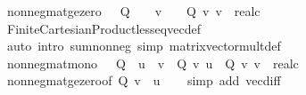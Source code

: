 \begin{isabellebody}
\endisatagproof
{\isafoldproof}%
%
\isadelimproof
\isanewline
%
\endisadelimproof
\isanewline
{}\isamarkupfalse%
\ nonneg{\isacharunderscore}{\kern0pt}mat{\isacharunderscore}{\kern0pt}ge{\isacharunderscore}{\kern0pt}zero{\isacharcolon}{\kern0pt}\ {\isachardoublequoteopen}{}\ {\isasymle}\ Q\ {\isasymLongrightarrow}\ {}\ {\isasymle}\ v\ {\isasymLongrightarrow}\ {}\ {\isasymle}\ Q\ {\isacharasterisk}{\kern0pt}v\ {\isacharparenleft}{\kern0pt}v\ {\isacharcolon}{\kern0pt}{\isacharcolon}{\kern0pt}\ real{\isacharcircum}{\kern0pt}{\isacharprime}{\kern0pt}c{\isacharparenright}{\kern0pt}{\isachardoublequoteclose}\isanewline
%
\isadelimproof
\ \ %
\endisadelimproof
%
\isatagproof
{}\isamarkupfalse%
\ Finite{\isacharunderscore}{\kern0pt}Cartesian{\isacharunderscore}{\kern0pt}Product{\isachardot}{\kern0pt}less{\isacharunderscore}{\kern0pt}eq{\isacharunderscore}{\kern0pt}vec{\isacharunderscore}{\kern0pt}def\isanewline
\ \ \isamarkupfalse%
\ {\isacharparenleft}{\kern0pt}auto\ intro{\isacharbang}{\kern0pt}{\isacharcolon}{\kern0pt}\ sum{\isacharunderscore}{\kern0pt}nonneg\ simp{\isacharcolon}{\kern0pt}\ matrix{\isacharunderscore}{\kern0pt}vector{\isacharunderscore}{\kern0pt}mult{\isacharunderscore}{\kern0pt}def{\isacharparenright}{\kern0pt}%
\endisatagproof
{\isafoldproof}%
%
\isadelimproof
\isanewline
%
\endisadelimproof
\isanewline
{}\isamarkupfalse%
\ nonneg{\isacharunderscore}{\kern0pt}mat{\isacharunderscore}{\kern0pt}mono{\isacharcolon}{\kern0pt}\ {\isachardoublequoteopen}{}\ {\isasymle}\ Q\ {\isasymLongrightarrow}\ u\ {\isasymle}\ v\ {\isasymLongrightarrow}\ Q\ {\isacharasterisk}{\kern0pt}v\ u\ {\isasymle}\ Q\ {\isacharasterisk}{\kern0pt}v\ {\isacharparenleft}{\kern0pt}v\ {\isacharcolon}{\kern0pt}{\isacharcolon}{\kern0pt}\ real{\isacharcircum}{\kern0pt}{\isacharprime}{\kern0pt}c{\isacharparenright}{\kern0pt}{\isachardoublequoteclose}\isanewline
%
\isadelimproof
\ \ %
\endisadelimproof
%
\isatagproof
{}\isamarkupfalse%
\ nonneg{\isacharunderscore}{\kern0pt}mat{\isacharunderscore}{\kern0pt}ge{\isacharunderscore}{\kern0pt}zero{\isacharbrackleft}{\kern0pt}of\ Q\ {\isachardoublequoteopen}v\ {\isacharminus}{\kern0pt}\ u{\isachardoublequoteclose}{\isacharbrackright}{\kern0pt}\isanewline
\ \ \isamarkupfalse%
\ {\isacharparenleft}{\kern0pt}simp\ add{\isacharcolon}{\kern0pt}\ vec{\isachardot}{\kern0pt}diff{\isacharparenright}{\kern0pt}%
\endisatagproof
{\isafoldproof}%
%
\isadelimproof
\isanewline
%
\endisadelimproof
\isanewline
{}\isamarkupfalse%

\end{isabellebody}
